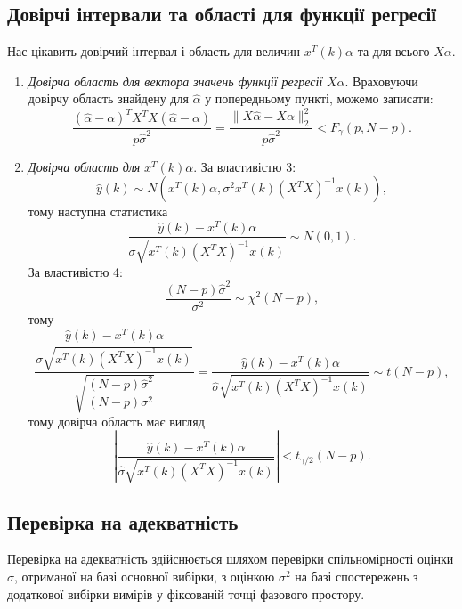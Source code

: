 \subsection{Довірчі інтервали та області для функції регресії}
Нас цікавить довірчий інтервал і область для величин $x^T(k)\alpha$ та для всього $X\alpha$.
\begin{enumerate}
	\item \textit{Довірча область для вектора значень функції регресії} $X\alpha$. Враховуючи довірчу область знайдену для $\widehat{\alpha}$ у попередньому пункті, можемо записати:
	\[\dfrac{(\widehat{\alpha}-\alpha)^TX^TX(\widehat{\alpha}-\alpha)}{p\widehat{\sigma}^2} = \dfrac{\|X\widehat{\alpha}-X\alpha\|_2^2}{p\widehat{\sigma}^2} < F_\gamma(p,N-p). \]
	\item \textit{Довірча область для} $x^T(k)\alpha$. За властивістю 3: \[ \widehat{y}(k) \sim N(x^T(k)\alpha,\sigma^2x^T(k)(X^TX)^{-1}x(k)), \] тому наступна статистика \[ \dfrac{\widehat{y}(k)-x^T(k)\alpha}{\sigma\sqrt{x^T(k)(X^TX)^{-1}x(k)}} \sim N(0,1). \]
	За властивістю 4: \[ \dfrac{(N-p)\widehat{\sigma}^2}{\sigma^2}\sim\chi^2(N-p), \] тому
	\[ \dfrac{\dfrac{\widehat{y}(k)-x^T(k)\alpha}{\sigma\sqrt{x^T(k)(X^TX)^{-1}x(k)}}}{\sqrt{\dfrac{(N-p)\widehat{\sigma}^2}{(N-p)\sigma^2}}} = \dfrac{\widehat{y}(k)-x^T(k)\alpha}{\widehat{\sigma}\sqrt{x^T(k)(X^TX)^{-1}x(k)}} \sim t(N-p), \] 
	тому довірча область має вигляд \[ \left|\dfrac{\widehat{y}(k)-x^T(k)\alpha}{\widehat{\sigma}\sqrt{x^T(k)(X^TX)^{-1}x(k)}}\right| < t_{\gamma/2}(N-p). \]
\end{enumerate}
\subsection{Перевірка на адекватність}
Перевірка на адекватність здійснюється шляхом перевірки спільномірності оцінки $\widehat{\sigma}$, отриманої на базі основної вибірки, з оцінкою $\sigma^2$ на базі спостережень з додаткової вибірки вимірів у фіксованій точці фазового простору. \\

